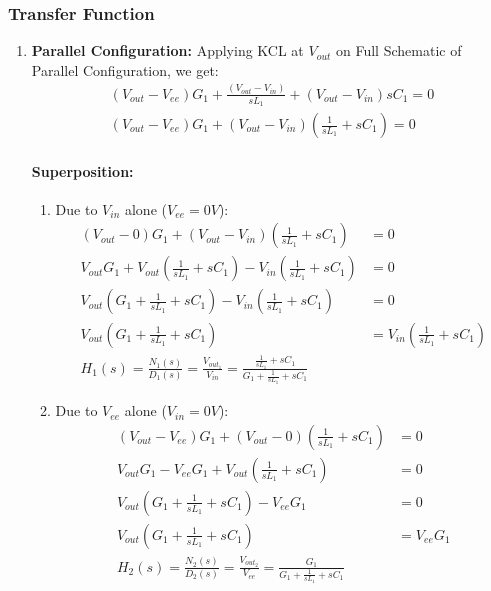 \subsubsection{Transfer Function}
\begin{enumerate}
  \item \textbf{Parallel Configuration:}
    Applying KCL at \(V_{out}\) on Full Schematic of Parallel
    Configuration, we get:
    \begin{align*}
      (V_{out} - V_{ee}){G_1} + \frac{(V_{out} - V_{in})}{sL_1} + (V_{out} - V_{in}){sC_1} = 0 \\
      (V_{out} - V_{ee}){G_1} + (V_{out} - V_{in})\left(\frac{1}{sL_1} + sC_1\right) = 0
    \end{align*}
    \paragraph{Superposition:}
      \begin{enumerate}
        \item Due to \(V_{in}\) alone (\(V_{ee} = 0V\)):
          \begin{align*}
            (V_{out} - 0){G_1} + (V_{out} - V_{in})\left(\frac{1}{sL_1} + sC_1\right) &= 0 \\
            V_{out}G_1 + V_{out}\left(\frac{1}{sL_1} + sC_1\right) - V_{in}\left(\frac{1}{sL_1} + sC_1\right) &= 0 \\
            V_{out}\left(G_1 + \frac{1}{sL_1} + sC_1\right) - V_{in}\left(\frac{1}{sL_1} + sC_1\right) &= 0 \\
            V_{out}\left(G_1 + \frac{1}{sL_1} + sC_1\right) &= V_{in}\left(\frac{1}{sL_1} + sC_1\right) \\
            \boxed{H_1(s) = \frac{N_1(s)}{D_1(s)} = \frac{V_{out_1}}{V_{in}} = \frac{\frac{1}{sL_1} + sC_1}{G_1 + \frac{1}{sL_1} + sC_1}}
          \end{align*}
        \item Due to \(V_{ee}\) alone (\(V_{in} = 0V\)):
          \begin{align*}
            (V_{out} - V_{ee}){G_1} + (V_{out} - 0)\left(\frac{1}{sL_1} + sC_1\right) &= 0 \\
            V_{out}G_1 - V_{ee}G_1 + V_{out}\left(\frac{1}{sL_1} + sC_1\right) &= 0 \\
            V_{out}\left(G_1 + \frac{1}{sL_1} + sC_1\right) - V_{ee}G_1 &= 0 \\
            V_{out}\left(G_1 + \frac{1}{sL_1} + sC_1\right) &= V_{ee}G_1 \\
            \boxed{H_2(s) = \frac{N_2(s)}{D_2(s)} = \frac{V_{out_2}}{V_{ee}} = \frac{G_1}{G_1 + \frac{1}{sL_1} + sC_1}}
          \end{align*}
      \end{enumerate}

\end{enumerate}
